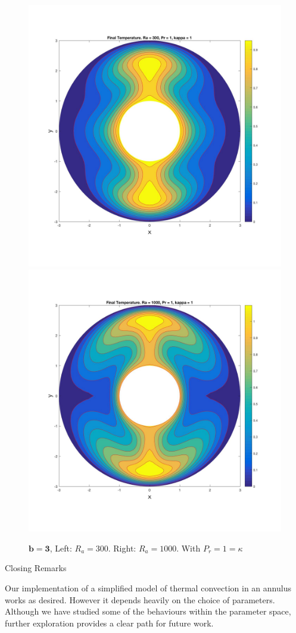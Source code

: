 \documentclass[final]{beamer}
\newlength{\onecolwid}
\begin{document}
\begin{frame}[t]
\begin{columns}[t]
\begin{column}{\onecolwid}
\begin{alertblock}

\begin{figure}
\includegraphics[width= .5\linewidth]{../project_3/fig_q4ra300b3}
\includegraphics[width= .5\linewidth]{../project_3/fig_q4ra1000b3.jpg}
\caption{$\boldsymbol{b=3}$, Left: $R_a = 300$. Right: $R_a = 1000$. With $P_r = 1 = \kappa$}
\label{fig:moreResults}
\end{figure}
\vspace{-1.5cm}
\end{alertblock} 


\begin{block}{Closing Remarks}

Our implementation of a simplified model of thermal convection in an annulus works as desired. However it depends heavily on the choice of parameters. Although we have studied some of the behaviours within the parameter space, further exploration provides a clear path for future work. 


\end{block}
\end{column}
\end{columns}
\end{frame}
\end{document}
